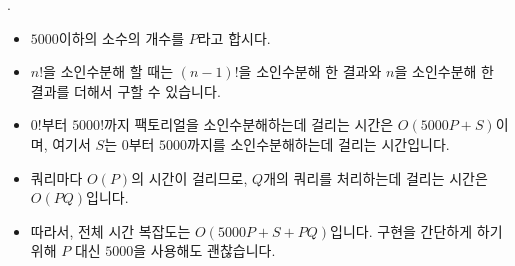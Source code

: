 \begin{frame}{\probno{}. \probtitle{}}
    \begin{itemize}
        \item $5000$이하의 소수의 개수를 $P$라고 합시다.
        \item $n!$을 소인수분해 할 때는 $(n-1)!$을 소인수분해 한 결과와 $n$을 소인수분해 한 결과를 더해서 구할 수 있습니다.
        \item $0!$부터 $5000!$까지 팩토리얼을 소인수분해하는데 걸리는 시간은 $O(5000P + S)$이며, 여기서 $S$는 $0$부터 $5000$까지를 소인수분해하는데 걸리는 시간입니다.
        \item 쿼리마다 $O(P)$의 시간이 걸리므로, $Q$개의 쿼리를 처리하는데 걸리는 시간은 $O(PQ)$입니다.
        \item 따라서, 전체 시간 복잡도는 $O(5000P + S + PQ)$입니다. 구현을 간단하게 하기 위해 $P$ 대신 $5000$을 사용해도 괜찮습니다.
    \end{itemize}
\end{frame}
